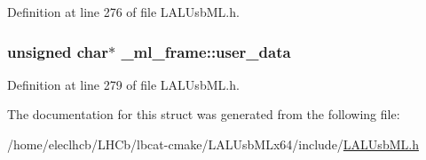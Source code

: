 Definition at line 276 of file LALUsbML.h.\hypertarget{struct__ml__frame_a0bf29f8a45b29b63e8593dcfb2a15ff6}{
\subsubsection[{user\_\-data}]{\setlength{\rightskip}{0pt plus 5cm}unsigned char$\ast$ {\bf \_\-ml\_\-frame::user\_\-data}}}
\label{struct__ml__frame_a0bf29f8a45b29b63e8593dcfb2a15ff6}


Definition at line 279 of file LALUsbML.h.

The documentation for this struct was generated from the following file:\begin{DoxyCompactItemize}
\item 
/home/eleclhcb/LHCb/lbcat-\/cmake/LALUsbMLx64/include/\hyperlink{LALUsbML_8h}{LALUsbML.h}\end{DoxyCompactItemize}

